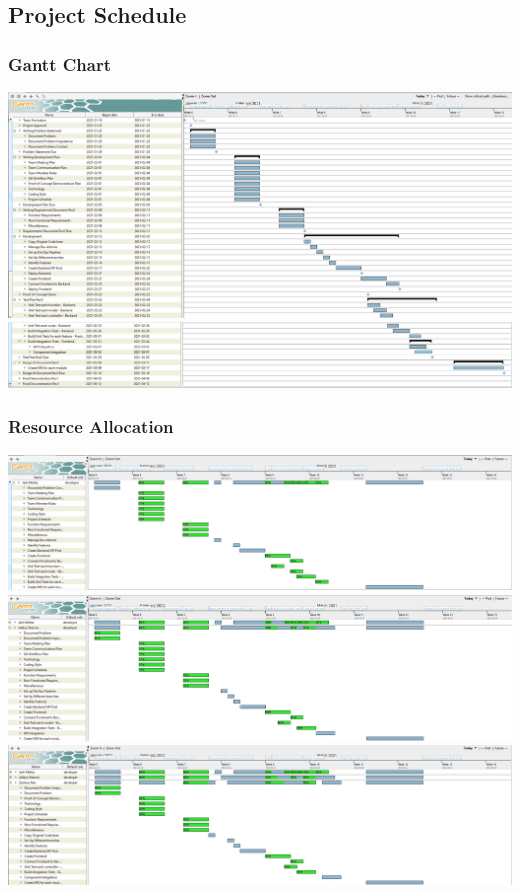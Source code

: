 \documentclass[11pt, oneside]{article}   	%
\begin{document}
\newpage
\subsection*{Project Schedule}
\subsubsection*{Gantt Chart}
\includegraphics[scale=0.3]{Screenshot1}
\includegraphics[scale=0.3]{Screenshot2}\\

\pagebreak
\noindent
\subsubsection*{Resource Allocation}
\includegraphics[scale=0.3]{Jash}
\includegraphics[scale=0.3]{Aditya}
\includegraphics[scale=0.3]{Zackary}
\newpage
\end{document}
